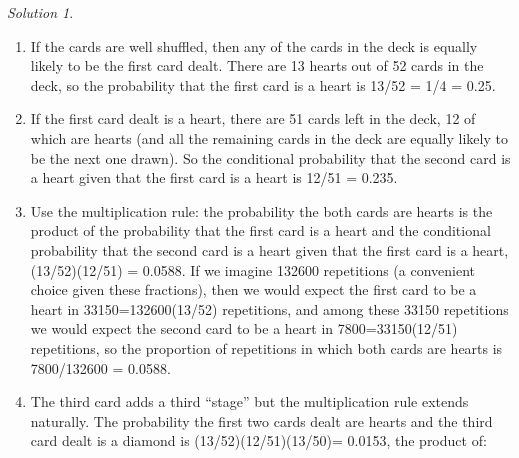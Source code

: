 \documentclass[
  letterpaper,
  DIV=11,
  numbers=noendperiod]{scrreprt}
\providecommand{\tightlist}{%
  \setlength{\itemsep}{0pt}\setlength{\parskip}{0pt}}
\theoremstyle{plain}
\theoremstyle{definition}
\theoremstyle{definition}
\theoremstyle{definition}
\theoremstyle{remark}
\newtheorem{refsolution}{Solution}[chapter]
\begin{document}
\begin{tcolorbox}[enhanced jigsaw, opacityback=0, rightrule=.15mm, coltitle=black, colframe=quarto-callout-tip-color-frame, toprule=.15mm, colbacktitle=quarto-callout-tip-color!10!white, opacitybacktitle=0.6, left=2mm, toptitle=1mm, breakable, title={Solution (click to expand)}, bottomtitle=1mm, colback=white, leftrule=.75mm, titlerule=0mm, arc=.35mm, bottomrule=.15mm]

\begin{refsolution}
\leavevmode

\begin{enumerate}
\def\labelenumi{\arabic{enumi}.}
\tightlist
\item
  If the cards are well shuffled, then any of the cards in the deck is
  equally likely to be the first card dealt. There are 13 hearts out of
  52 cards in the deck, so the probability that the first card is a
  heart is 13/52 = 1/4 = 0.25.
\item
  If the first card dealt is a heart, there are 51 cards left in the
  deck, 12 of which are hearts (and all the remaining cards in the deck
  are equally likely to be the next one drawn). So the conditional
  probability that the second card is a heart given that the first card
  is a heart is 12/51 = 0.235.
\item
  Use the multiplication rule: the probability the both cards are hearts
  is the product of the probability that the first card is a heart and
  the conditional probability that the second card is a heart given that
  the first card is a heart, (13/52)(12/51) = 0.0588. If we imagine
  132600 repetitions (a convenient choice given these fractions), then
  we would expect the first card to be a heart in 33150=132600(13/52)
  repetitions, and among these 33150 repetitions we would expect the
  second card to be a heart in 7800=33150(12/51) repetitions, so the
  proportion of repetitions in which both cards are hearts is
  7800/132600 = 0.0588.
\item
  The third card adds a third ``stage'' but the multiplication rule
  extends naturally. The probability the first two cards dealt are
  hearts and the third card dealt is a diamond is (13/52)(12/51)(13/50)=
  0.0153, the product of:


\end{enumerate}
\end{refsolution}
\end{tcolorbox}
\end{document}
